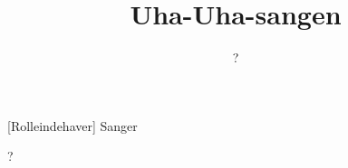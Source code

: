 \documentclass[a4paper,11pt]{article}
\title{Uha-Uha-sangen}
\author{?}
\begin{document}
\maketitle

\begin{roles}  
[Rolleindehaver] Sanger
\end{roles}

?
\end{document}
